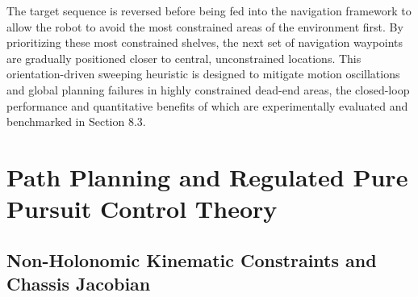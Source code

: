 The target sequence is reversed before being fed into the navigation framework to allow the robot to avoid the most constrained areas of the environment first. By prioritizing these most constrained shelves, the next set of navigation waypoints are gradually positioned closer to central, unconstrained locations. This orientation-driven sweeping heuristic is designed to mitigate motion oscillations and global planning failures in highly constrained dead-end areas, the closed-loop performance and quantitative benefits of which are experimentally evaluated and benchmarked in Section 8.3.

\section{Path Planning and Regulated Pure Pursuit Control Theory}

\subsection{Non-Holonomic Kinematic Constraints and Chassis Jacobian}

